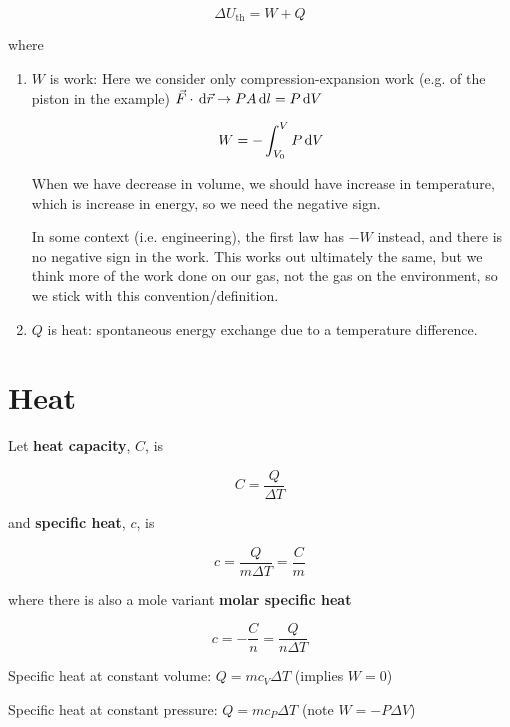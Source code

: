 \begin{definition}
	\begin{equation}
		\Delta U_\mathrm{th} = W + Q
	\end{equation}

	where

	\begin{enumerate}
		\item $W$ is work: Here we consider only compression-expansion work (e.g. of the piston in the example) $\vec F \cdot \D \vec r \to PA\D l = P\D V$

		\begin{equation}
			W = -\int_{V_0}^V P \D V
		\end{equation}

		When we have decrease in volume, we should have increase in temperature, which is increase in energy, so we need the negative sign.

		\begin{remark}
			In some context (i.e. engineering), the first law has $-W$ instead, and there is no negative sign in the work. This works out ultimately the same, but we think more of the work done on our gas, not the gas on the environment, so we stick with this convention/definition.
		\end{remark}

		\item $Q$ is heat: spontaneous energy exchange due to a temperature difference.
	\end{enumerate}
\end{definition}

\section{Heat}

\begin{definition}[Heat]
	Let \textbf{heat capacity}, $C$, is

	\begin{equation}
		C = \frac{Q}{\Delta T}
	\end{equation}

	and \textbf{specific heat}, $c$, is

	\begin{equation}
		c = \frac{Q}{m\Delta T} = \frac{C}{m}
	\end{equation}

	where there is also a mole variant \textbf{molar specific heat}

	\begin{equation}
		c = -\frac{C}{n} = \frac{Q}{n \Delta T}
	\end{equation}

	Specific heat at constant volume: $Q = m c_V \Delta T$ (implies $W = 0$)

	Specific heat at constant pressure: $Q = m c_P \Delta T$ (note $W = -P\Delta V$)
\end{definition}

